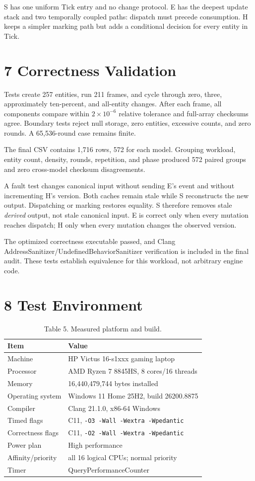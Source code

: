 S has one uniform Tick entry and no change protocol. E has the deepest update stack and two temporally coupled paths: dispatch must precede consumption. H keeps a simpler marking path but adds a conditional decision for every entity in Tick.

\section{7 Correctness Validation}

Tests create 257 entities, run 211 frames, and cycle through zero, three, approximately ten-percent, and all-entity changes. After each frame, all components compare within \(2\times10^{-6}\) relative tolerance and full-array checksums agree. Boundary tests reject null storage, zero entities, excessive counts, and zero rounds. A 65,536-round case remains finite.

The final CSV contains 1,716 rows, 572 for each model. Grouping workload, entity count, density, rounds, repetition, and phase produced 572 paired groups and zero cross-model checksum disagreements.

A fault test changes canonical input without sending E's event and without incrementing H's version. Both caches remain stale while S reconstructs the new output. Dispatching or marking restores equality. S therefore removes stale \emph{derived} output, not stale canonical input. E is correct only when every mutation reaches dispatch; H only when every mutation changes the observed version.

The optimized correctness executable passed, and Clang AddressSanitizer/UndefinedBehaviorSanitizer verification is included in the final audit. These tests establish equivalence for this workload, not arbitrary engine code.

\section{8 Test Environment}

\begin{table}
\caption{Table 5. Measured platform and build.}
\begin{tabular}{ll}
Item & Value \\
\hline
Machine & HP Victus 16-s1xxx gaming laptop \\
Processor & AMD Ryzen 7 8845HS, 8 cores/16 threads \\
Memory & 16,440,479,744 bytes installed \\
Operating system & Windows 11 Home 25H2, build 26200.8875 \\
Compiler & Clang 21.1.0, x86-64 Windows \\
Timed flags & C11, \texttt{-O3 -Wall -Wextra -Wpedantic} \\
Correctness flags & C11, \texttt{-O2 -Wall -Wextra -Wpedantic} \\
Power plan & High performance \\
Affinity/priority & all 16 logical CPUs; normal priority \\
Timer & QueryPerformanceCounter \\
\end{tabular}
\end{table}

